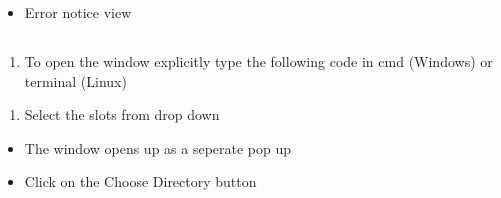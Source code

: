 \documentclass[letterpaper,10pt,english]{sphinxmanual}
\begin{document}
\begin{itemize}
\item {} 
Error notice view

\end{itemize}



\subsection{}
\label{\detokenize{user_manual:working-in-gui-2}}

\subsubsection{}
\label{\detokenize{user_manual:id1}}
\begin{enumerate}
%
\item {} 
To open the window explicitly type the following code in cmd (Windows) or terminal (Linux)

\end{enumerate}

\begin{sphinxVerbatim}[commandchars=\\\{\}]
 
\end{sphinxVerbatim}
\begin{enumerate}
%
\setcounter{enumi}{1}
\item {} 
Select the slots from drop down

\end{enumerate}
\begin{itemize}
\item {} 
The window opens up as a seperate pop up

\end{itemize}

\begin{itemize}
\item {} 
Click on the Choose Directory button

\end{itemize}
\end{document}
